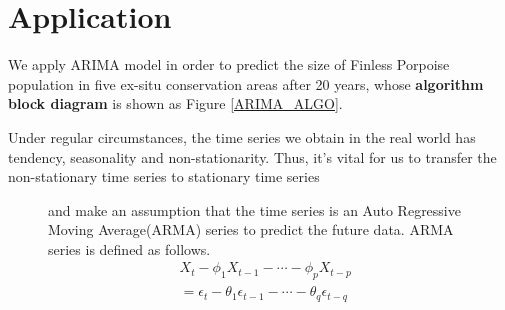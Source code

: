 \documentclass{mcmthesis}
\numberwithin{figure}{section}
\numberwithin{table}{section}
\numberwithin{equation}{section}
\begin{document}
\section{Application}
We apply ARIMA model in order to predict the size of Finless Porpoise population in five ex-situ 
conservation areas after 20 years, whose \textbf{algorithm block diagram} 
is shown as Figure \ref{ARIMA_ALGO}.
\par
Under regular circumstances, the time series we obtain in the real world
  has tendency, seasonality and non-stationarity. Thus, it's vital for 
  us to transfer the non-stationary time series to stationary time series
\par
\begin{figure}[ht]
\begin{minipage}[htbp]{0.35\linewidth}
  and make an assumption that the time series is an Auto 
  Regressive Moving Average(ARMA) series to predict the 
  future data. ARMA series is defined as follows.
  \begin{align*}
    &X_t-\phi_1X_{t-1}-\cdots -\phi_pX_{t-p} \\
    &= \epsilon_t - \theta_1\epsilon_{t-1}-\cdots-\theta_q\epsilon_{t-q}
  \end{align*}
 

\end{minipage}
\end{figure}
\end{document}
